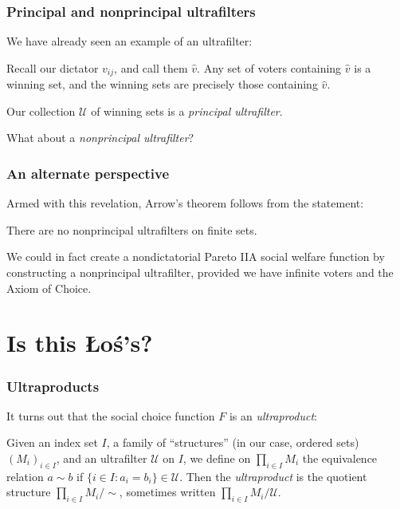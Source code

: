 \documentclass{beamer}
\theoremstyle{definition}
\begin{document}
\begin{frame}
    \frametitle{Principal and nonprincipal ultrafilters}

    We have already seen an example of an ultrafilter:

    \pause
    Recall our dictator $v_{ij}$, and call them $\hat{v}$.
    \pause
    Any set of voters containing $\hat{v}$ is a winning set, and the winning sets are precisely those containing $\hat{v}$.
    
    \pause
    Our collection $\mathcal{U}$ of winning sets is a \emph{principal ultrafilter}.

    \pause
    What about a \emph{nonprincipal ultrafilter}?

\end{frame}

\begin{frame}
    \frametitle{An alternate perspective}

    Armed with this revelation, Arrow's theorem follows from the statement:

    \pause
    \begin{theorem}
        There are no nonprincipal ultrafilters on finite sets.
    \end{theorem}

    \pause
    We could in fact create a nondictatorial Pareto IIA social welfare function by constructing a nonprincipal ultrafilter,
    provided we have infinite voters and the Axiom of Choice.

\end{frame}

\section{Is this Łoś's?}

\begin{frame}
    \frametitle{Ultraproducts}

    It turns out that the social choice function $F$ is an \emph{ultraproduct}:

    \pause
    Given an index set $I$, a family of ``structures'' (in our case, ordered sets) $(M_i)_{i \in I}$, and an ultrafilter $\mathcal{U}$ on $I$,
    we define on $\prod_{i \in I} M_i$ the equivalence relation $a \sim b$ if $\{i \in I : a_i = b_i\} \in \mathcal{U}$. Then the \emph{ultraproduct} is
    the quotient structure $\prod_{i \in I} M_i / \sim$, sometimes written $\prod_{i \in I} M_i / \mathcal{U}$.

\end{frame}
\end{document}

